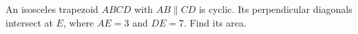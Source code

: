 An isosceles trapezoid $ABCD$ with $AB\parallel CD$ is cyclic. Its perpendicular diagonals intersect at $E$, where $AE=3$ and $DE=7$. Find its area.
